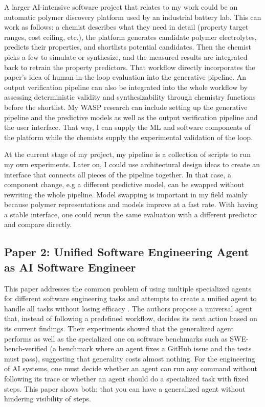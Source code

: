 \documentclass[11pt,a4paper]{article}
\begin{document}
A larger AI-intensive software project that relates to my work could be an automatic polymer discovery platform used by an industrial battery lab. This can work as follows: a chemist describes what they need in detail (property target ranges, cost ceiling, etc.), the platform generates candidate polymer electrolytes, predicts their properties, and shortlists potential candidates. Then the chemist picks a few to simulate or synthesize, and the measured results are integrated back to retrain the property predictors. That workflow directly incorporates the paper's idea of human-in-the-loop evaluation into the generative pipeline. An output verification pipeline can also be integrated into the whole workflow by assessing deterministic validity and synthesizability through chemistry functions before the shortlist. My WASP research can include setting up the generative pipeline and the predictive models as well as the output verification pipeline and the user interface. That way, I can supply the ML and software components of the platform while the chemists supply the experimental validation of the loop.


At the current stage of my project, my pipeline is a collection of scripts to run my own experiments. Later on, I could use architectural design ideas to create an interface that connects all pieces of the pipeline together. In that case, a component change, e.g a different predictive model, can be swapped without rewriting the whole pipeline. Model swapping is important in my field mainly because polymer representations and models improve at a fast rate. With having a stable interface, one could rerun the same evaluation with a different predictor and compare directly.

\subsection*{Paper 2: Unified Software Engineering Agent as AI Software Engineer}

This paper addresses the common problem of using multiple specialized agents for different software engineering tasks and attempts to create a unified agent to handle all tasks without losing efficacy \cite{unified_agent}. The authors propose a universal agent that, instead of following a predefined workflow, decides its next action based on its current findings. Their experiments showed that the generalized agent performs as well as the specialized one on software benchmarks such as SWE-bench-verified (a benchmark where an agent fixes a GitHub issue and the tests must pass), suggesting that generality costs almost nothing. For the engineering of AI systems, one must decide whether an agent can run any command without following its trace or whether an agent should do a specialized task with fixed steps. This paper shows both: that you can have a generalized agent without hindering visibility of steps.
\end{document}
